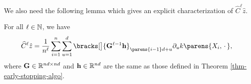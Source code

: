 We also need the following lemma which gives an explicit characterization of $\widehat{C}^{\ell} \hat{z}$. 

\begin{lemma}\label{lemma-C-power-z}
	For all $\ell \in \mathbb{N}$, we have 
	\begin{align}\label{eq-C-power-z}
		\widehat{C}^{\ell} \hat{z} = \frac{1}{n^{\ell}} \sum_{i=1}^n \sum_{u=1}^d \bracks[\big]{\bG^{\ell-1} \bh}_{\parens{i-1}d+u} \partial_u k \parens{X_i, \,\cdot\,}, 
	\end{align}
	where $\mathbf{G} \in \mathbb{R}^{nd \times nd}$ and $\mathbf{h} \in \mathbb{R}^{nd}$ are the same as those defined in Theorem \ref{thm-early-stopping-algo}. 
\end{lemma}


